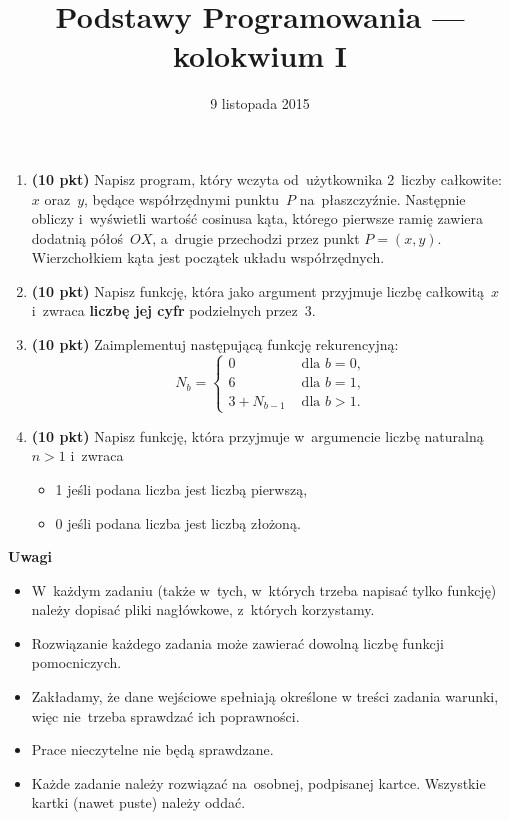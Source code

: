 \documentclass[extrafontsizes,12pt]{article}
\title{Podstawy Programowania --- kolokwium I}
\date{9 listopada 2015}
\begin{document}
\maketitle
\DefineShortVerb{\|}
\thispagestyle{empty}

\begin{enumerate}
\itemsep1em


\item \textbf{(10 pkt)}
Napisz program, który wczyta od~użytkownika 2~liczby całkowite: $x$ oraz~$y$,
będące współrzędnymi punktu~$P$ na~płaszczyźnie.
Następnie obliczy i~wyświetli wartość cosinusa kąta,
którego pierwsze ramię zawiera dodatnią półoś~$OX$,
a~drugie przechodzi przez punkt $P=(x, y)$.
Wierzchołkiem kąta jest początek układu współrzędnych.

\item \textbf{(10 pkt)}
Napisz funkcję, która jako argument przyjmuje liczbę całkowitą~$x$
i~zwraca \textbf{liczbę jej cyfr} podzielnych przez~3.

\item \textbf{(10 pkt)}
Zaimplementuj następującą funkcję rekurencyjną:
\begin{equation*}
 N_b = \begin{cases}
    0 & \mbox{ dla } b = 0, \\
    6 & \mbox{ dla } b = 1, \\
    3 + N_{b-1} & \mbox{ dla } b > 1.
       \end{cases}
\end{equation*}

\item \textbf{(10 pkt)}
Napisz funkcję, która przyjmuje w~argumencie liczbę naturalną~$n>1$
i~zwraca
\begin{itemize}
  \item 1 jeśli podana liczba jest liczbą pierwszą,
  \item 0 jeśli podana liczba jest liczbą złożoną.
\end{itemize}

\end{enumerate}

\vfill

\textbf{Uwagi}

\begin{itemize}
\item W~każdym zadaniu (także w~tych, w~których trzeba napisać tylko funkcję) należy dopisać pliki nagłówkowe, z~których korzystamy.
\item Rozwiązanie każdego zadania może zawierać dowolną liczbę funkcji pomocniczych.
\item Zakładamy, że dane wejściowe spełniają określone w treści zadania warunki, więc nie~trzeba sprawdzać ich poprawności.
\item Prace nieczytelne nie będą sprawdzane.
\item Każde zadanie należy rozwiązać na~osobnej, podpisanej kartce. Wszystkie kartki (nawet puste) należy oddać.
\end{itemize}
\end{document}
